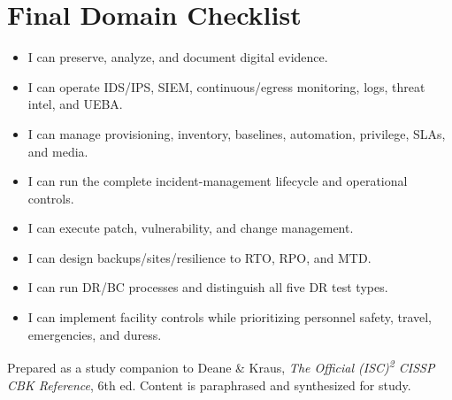 \documentclass[10pt,letterpaper]{article}
\begin{document}
\section{Final Domain Checklist}
\begin{itemize}[label=\(\square\)]
\item I can preserve, analyze, and document digital evidence.
\item I can operate IDS/IPS, SIEM, continuous/egress monitoring, logs, threat intel, and UEBA.
\item I can manage provisioning, inventory, baselines, automation, privilege, SLAs, and media.
\item I can run the complete incident-management lifecycle and operational controls.
\item I can execute patch, vulnerability, and change management.
\item I can design backups/sites/resilience to RTO, RPO, and MTD.
\item I can run DR/BC processes and distinguish all five DR test types.
\item I can implement facility controls while prioritizing personnel safety, travel, emergencies, and duress.
\end{itemize}
\vfill{\footnotesize\color{Teal}Prepared as a study companion to Deane \& Kraus, \textit{The Official (ISC)\textsuperscript{2} CISSP CBK Reference}, 6th ed. Content is paraphrased and synthesized for study.}
\end{document}

